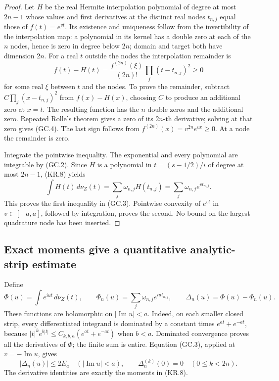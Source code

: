 \begin{proof}
Let \(H\) be the real Hermite interpolation polynomial of degree at
most \(2n-1\) whose values and first derivatives at the distinct real
nodes \(t_{n,j}\) equal those of \(f(t)=e^{vt}\).  Its existence and
uniqueness follow from the invertibility of the interpolation map:
a polynomial in its kernel has a double zero at each of the \(n\)
nodes, hence is zero in degree below \(2n\); domain and target both
have dimension \(2n\).
For a real \(t\) outside the nodes the interpolation remainder is
\[
 f(t)-H(t)=\frac{f^{(2n)}(\xi)}{(2n)!}
                    \prod_j(t-t_{n,j})^2\geq0           \tag{GC.4}
\]
for some real \(\xi\) between \(t\) and the nodes.  To prove the
remainder, subtract \(C\prod_j(x-t_{n,j})^2\) from \(f(x)-H(x)\),
choosing \(C\) to produce an additional zero at \(x=t\).
The resulting function has the \(n\) double zeros and the additional
zero.  Repeated Rolle's theorem gives a zero of its \(2n\)-th
derivative; solving at that zero gives (GC.4).  The last sign follows
from \(f^{(2n)}(x)=v^{2n}e^{vx}\geq0\).  At a node the remainder is
zero.

Integrate the pointwise inequality.  The exponential and every
polynomial are integrable by (GC.2).  Since \(H\) is a polynomial
in \(t=(s-1/2)/i\) of degree at most \(2n-1\), (KR.8) yields
\[
 \int H(t)\,d\nu_Z(t)
  =\sum_j\omega_{n,j}H(t_{n,j})
  =\sum_j\omega_{n,j}e^{vt_{n,j}}.
\]
This proves the first inequality in (GC.3).  Pointwise convexity of
\(e^{vt}\) in \(v\in[-a,a]\), followed by integration, proves the
second.  No bound on the largest quadrature node has been inserted.
\end{proof}

\subsection{Exact moments give a quantitative analytic-strip estimate}

Define
\[
 \Phi(u)=\int e^{iut}\,d\nu_Z(t),\qquad
 \Phi_n(u)=\sum_j\omega_{n,j}e^{iut_{n,j}},\qquad
 \Delta_n(u)=\Phi(u)-\Phi_n(u).
                                                        \tag{GC.5}
\]
These functions are holomorphic on \(|\operatorname{Im}u|<a\).
Indeed, on each smaller closed strip, every differentiated integrand
is dominated by a constant times \(e^{at}+e^{-at}\), because
\(|t|^k e^{b|t|}\leq C_{k,b,a}(e^{at}+e^{-at})\) when \(b<a\).
Dominated convergence proves all the derivatives of \(\Phi\); the
finite sum is entire.  Equation (GC.3), applied at
\(v=-\operatorname{Im}u\), gives
\[
 |\Delta_n(u)|\leq2E_a\quad(|\operatorname{Im}u|<a),
 \qquad \Delta_n^{(k)}(0)=0\quad(0\leq k<2n).            \tag{GC.6}
\]
The derivative identities are exactly the moments in (KR.8).

